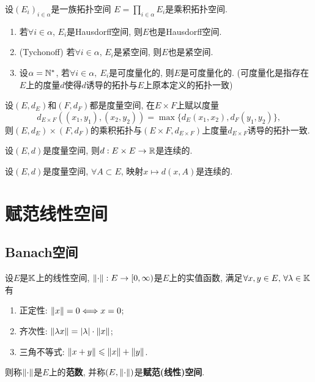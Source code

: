     \begin{Proposition}\label{prop:乘积拓扑空间的继承性质}
    设$ (E_i)_{i\in\alpha} $是一族拓扑空间 $ E=\prod\limits_{i\in\alpha}E_i $是乘积拓扑空间.
    \begin{enumerate}[(1)]
    \item 若$ \forall i\in\alpha $, $ E_i $是Hausdorff空间, 则$ E $也是Hausdorff空间.

    \item (Tychonoff) 若$ \forall i\in\alpha $, $ E_i $是紧空间, 则$ E $也是紧空间.

    \item 设$ \alpha=\mathbb{N}^\ast $, 若$ \forall i\in\alpha,\ E_i $是可度量化的, 则$ E $是可度量化的. (可度量化是指存在$ E $上的度量$ d $使得$ d $诱导的拓扑与$ E $上原本定义的拓扑一致)
    \end{enumerate}
    \end{Proposition}

    \begin{Remark}
    设$ (E,d_E) $和$ (F,d_F) $都是度量空间, 在$ E\times F $上赋以度量
    \[
    d_{E\times F}\left((x_1,y_1),(x_2,y_2)\right)=\max\{ d_E(x_1,x_2), d_F(y_1,y_2) \},
    \]
    则$ (E,d_E) \times (F,d_F) $的乘积拓扑与$ (E\times F, d_{E\times F}) $上度量$ d_{E\times F} $诱导的拓扑一致.
    \end{Remark}

    \begin{Proposition}
    设$ (E,d) $是度量空间, 则$ d : E\times E\to\mathbb{R} $是连续的.
    \end{Proposition}
    \begin{Corollary}\label{cor:距离函数连续}
    设$ (E,d) $是度量空间, $ \forall A\subset E $, 映射$ x\mapsto d(x,A) $是连续的.
    \end{Corollary}

\section{赋范线性空间}

    \subsection{Banach空间}

    \begin{Definition}[赋范空间]\label{def:赋范空间}
    设$ E $是$ \mathbb{K} $上的线性空间, $ \left\| \cdot \right\| : E\to[0,\infty) $是$ E $上的实值函数, 满足$ \forall x,y\in E,\,\forall\lambda\in\mathbb{K} $有

    \begin{enumerate}[(1)]
    \item 正定性: $ \left\| x \right\|=0\Longleftrightarrow x=0 $;

    \item 齐次性: $ \left\| \lambda x \right\|=\left| \lambda \right| \cdot\left\| x \right\| $;

    \item 三角不等式: $ \left\| x+y \right\|\leqslant\left\| x \right\|+\left\| y \right\| $.
    \end{enumerate}
    则称$ \left\| \cdot \right\| $是$ E $上的\textbf{范数}, 并称$ (E,\left\| \cdot \right\|) $是\textbf{赋范(线性)空间}.
    \end{Definition}

